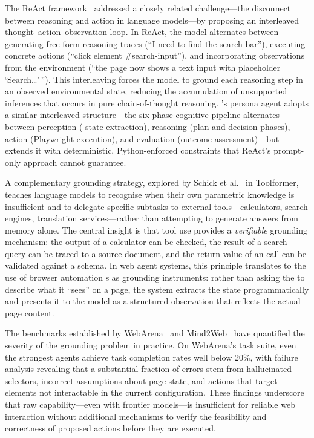 The ReAct framework~\cite{yao2023react} addressed a closely related challenge---the disconnect between reasoning and action in language models---by proposing an interleaved thought--action--observation loop. In ReAct, the model alternates between generating free-form reasoning traces (``I need to find the search bar''), executing concrete actions (``click element \#search-input''), and incorporating observations from the environment (``the page now shows a text input with placeholder `Search\ldots'\,''). This interleaving forces the model to ground each reasoning step in an observed environmental state, reducing the accumulation of unsupported inferences that occurs in pure chain-of-thought reasoning. \versimux{}'s persona agent adopts a similar interleaved structure---the six-phase cognitive pipeline alternates between perception ( state extraction), reasoning (plan and decision phases), action (Playwright execution), and evaluation (outcome assessment)---but extends it with deterministic, Python-enforced constraints that ReAct's prompt-only approach cannot guarantee.

A complementary grounding strategy, explored by Schick et al.~\cite{schick2023toolformer} in Toolformer, teaches language models to recognise when their own parametric knowledge is insufficient and to delegate specific subtasks to external tools---calculators, search engines, translation services---rather than attempting to generate answers from memory alone. The central insight is that tool use provides a \textit{verifiable} grounding mechanism: the output of a calculator can be checked, the result of a search query can be traced to a source document, and the return value of an  call can be validated against a schema. In web agent systems, this principle translates to the use of browser automation s as grounding instruments: rather than asking the  to describe what it ``sees'' on a page, the system extracts the  state programmatically and presents it to the model as a structured observation that reflects the actual page content.

The benchmarks established by WebArena~\cite{zhou2024webarena} and Mind2Web~\cite{deng2023mind2web} have quantified the severity of the grounding problem in practice. On WebArena's task suite, even the strongest  agents achieve task completion rates well below 20\%, with failure analysis revealing that a substantial fraction of errors stem from hallucinated selectors, incorrect assumptions about page state, and actions that target elements not interactable in the current  configuration. These findings underscore that raw  capability---even with frontier models---is insufficient for reliable web interaction without additional mechanisms to verify the feasibility and correctness of proposed actions before they are executed.

